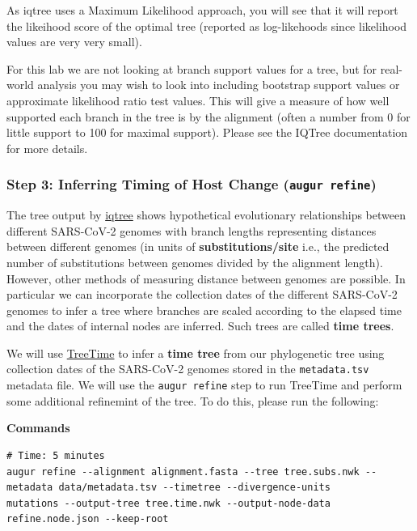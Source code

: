 \documentclass[
]{book}
\begin{document}
As iqtree uses a Maximum Likelihood approach, you will see that it will report the likeihood score of the optimal tree (reported as log-likehoods since likelihood values are very very small).

For this lab we are not looking at branch support values for a tree, but for real-world analysis you may wish to look into including bootstrap support values or approximate likelihood ratio test values. This will give a measure of how well supported each branch in the tree is by the alignment (often a number from 0 for little support to 100 for maximal support). Please see the IQTree documentation for more details.

\subsubsection{\texorpdfstring{Step 3: Inferring Timing of Host Change (\texttt{augur\ refine})}{Step 3: Inferring Timing of Host Change (augur refine)}}\label{step-3-inferring-timing-of-host-change-augur-refine}

The tree output by \href{http://www.iqtree.org/}{iqtree} shows hypothetical evolutionary relationships between different SARS-CoV-2 genomes with branch lengths representing distances between different genomes (in units of \textbf{substitutions/site} i.e., the predicted number of substitutions between genomes divided by the alignment length). However, other methods of measuring distance between genomes are possible. In particular we can incorporate the collection dates of the different SARS-CoV-2 genomes to infer a tree where branches are scaled according to the elapsed time and the dates of internal nodes are inferred. Such trees are called \textbf{time trees}.

We will use \href{https://treetime.readthedocs.io/en/latest/}{TreeTime} to infer a \textbf{time tree} from our phylogenetic tree using collection dates of the SARS-CoV-2 genomes stored in the \texttt{metadata.tsv} metadata file. We will use the \texttt{augur\ refine} step to run TreeTime and perform some additional refinemint of the tree. To do this, please run the following:

\textbf{Commands}

\begin{verbatim}
# Time: 5 minutes
augur refine --alignment alignment.fasta --tree tree.subs.nwk --metadata data/metadata.tsv --timetree --divergence-units
mutations --output-tree tree.time.nwk --output-node-data refine.node.json --keep-root
\end{verbatim}
\end{document}

